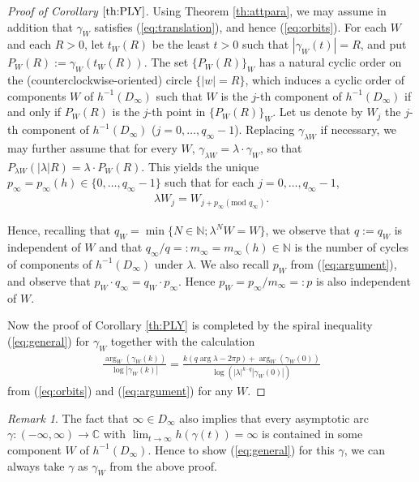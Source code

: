 \documentclass[a4paper,12pt]{amsart}
\theoremstyle{plain}
\theoremstyle{definition}
\theoremstyle{remark}
\newtheorem{remark}[equation]{Remark}
\numberwithin{equation}{section}
\begin{document}
\begin{proof}[Proof of Corollary $\ref{th:PLY}$]
Using Theorem \ref{th:attpara}, we may assume in addition that 
$\gamma_W$ satisfies (\ref{eq:translation}), and hence (\ref{eq:orbits}).
For each $W$ and each $R>0$, let $t_W(R)$ be the least $t>0$
such that $|\gamma_W(t)|=R$, and put $P_W(R):=\gamma_W(t_W(R))$.
The set $\{P_W(R)\}_W$ has a natural cyclic order on the
(counterclockwise-oriented) circle $\{|w|=R\}$,
which induces a cyclic order of components $W$ of $h^{-1}(D_{\infty})$
such that $W$ is the $j$-th component of $h^{-1}(D_{\infty})$ if and only if
$P_W(R)$ is the $j$-th point in $\{P_W(R)\}_W$. Let us denote by $W_j$
the $j$-th component of $h^{-1}(D_{\infty})$ ($j=0,\ldots,q_{\infty}-1$).
Replacing $\gamma_{\lambda W}$ if necessary, 
we may further assume that for every $W$, $\gamma_{\lambda W}=\lambda\cdot\gamma_W$,
so that $P_{\lambda W}(|\lambda|R)=\lambda\cdot P_W(R)$.
This yields the unique $p_{\infty}=p_{\infty}(h)\in\{0,\ldots,q_{\infty}-1\}$
such that for each $j=0,\ldots,q_{\infty}-1$,
\begin{gather}
 \lambda W_j=W_{j+p_{\infty}(\text{mod }q_{\infty})}.\label{eq:cyclic}
\end{gather}

Hence, recalling that $q_W=\min\{N\in{\mathbb{N}};\lambda^N W=W\}$,
we observe that $q:=q_W$ is independent of $W$ and that 
$q_{\infty}/q=:m_{\infty}=m_{\infty}(h)\in{\mathbb{N}}$ is 
the number of cycles of components of $h^{-1}(D_{\infty})$ under $\lambda$.
We also recall $p_W$ from (\ref{eq:argument}), 
and observe that $p_W\cdot q_{\infty}=q_W\cdot p_{\infty}$. 
Hence $p_W=p_{\infty}/m_{\infty}=:p$ is also independent of $W$.

Now the proof of Corollary \ref{th:PLY} is completed by
the spiral inequality (\ref{eq:general}) for $\gamma_W$ together with the calculation
\begin{gather*}
\frac{\arg_W(\gamma_W(k))}{\log|\gamma_W(k)|}
=\frac{k(q\arg\lambda-2\pi p)+\arg_W(\gamma_W(0))}{\log(|\lambda|^{k\cdot q}|\gamma_W(0)|)}
\end{gather*}
from (\ref{eq:orbits}) and (\ref{eq:argument}) for any $W$.
\end{proof}

\begin{remark}
The fact that $\infty\in D_{\infty}$ also implies that
every asymptotic arc $\gamma:(-\infty,\infty)\to{\mathbb{C}}$
with $\lim_{t\to\infty}h(\gamma(t))=\infty$ is contained in some component
$W$ of $h^{-1}(D_{\infty})$. Hence to show (\ref{eq:general}) for 
this $\gamma$, we can always take $\gamma$ as $\gamma_W$ from the above proof.
\end{remark}
\end{document}
